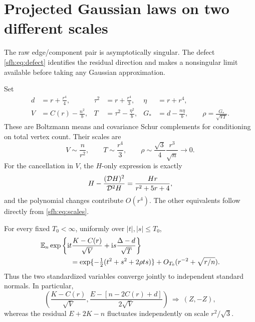 \section{Projected Gaussian laws on two different scales}\label{sfh:sec:gaussian}
The raw edge/component pair is asymptotically singular. The defect \eqref{sfh:eq:defect} identifies the residual direction and makes a nonsingular limit available before taking any Gaussian approximation.

Set
\begin{align}
 d&=r+\frac{r^4}{4},& \tau^2&=r+\frac{r^4}{3},& \eta&=r+r^4,\label{sfh:eq:dmeans}\\
 V&=C(r)-\frac{n^2}{b},& T&=\tau^2-\frac{\eta^2}{b},&
 G_*&=d-\frac{n\eta}{b},\qquad \rho=\frac{G_*}{\sqrt{VT}}.\label{sfh:eq:schur}
\end{align}
These are Boltzmann means and covariance Schur complements for conditioning on total vertex count. Their scales are
\begin{equation}\label{sfh:eq:schurscales}
 V\sim\frac n{r^2},\qquad T\sim\frac{r^4}{3},\qquad
 \rho\sim\frac{\sqrt3}{4}\frac{r^3}{\sqrt n}\longrightarrow0.
\end{equation}
For the cancellation in $V$, the $H$-only expression is exactly
\[
 H-\frac{(\mathcal D H)^2}{\mathcal D^2H}
 =\frac{Hr}{r^2+5r+4},
\]
and the polynomial changes contribute $O(r^4)$. The other equivalents follow directly from \eqref{sfh:eq:scales}.

\begin{theorem}\label{sfh:thm:gauss}
For every fixed $T_0<\infty$, uniformly over $|t|,|s|\le T_0$,
\begin{align}\label{sfh:eq:gauss}
 &\E_n\exp\left\{\ii t\frac{K-C(r)}{\sqrt V}
                     +\ii s\frac{\defect-d}{\sqrt T}\right\}\nonumber\\
 &\hspace{15mm}=\exp\{-\tfrac12(t^2+s^2+2\rho ts)\}
       +O_{T_0}(r^{-2}+\sqrt{r/n}).
\end{align}
Thus the two standardized variables converge jointly to independent standard normals. In particular,
\begin{equation}\label{sfh:eq:degenerate}
 \left(\frac{K-C(r)}{\sqrt V},
       \frac{E-[n-2C(r)+d]}{2\sqrt V}\right)
 \ \Longrightarrow\ (Z,-Z),
\end{equation}
whereas the residual $E+2K-n$ fluctuates independently on scale $r^2/\sqrt3$.
\end{theorem}

